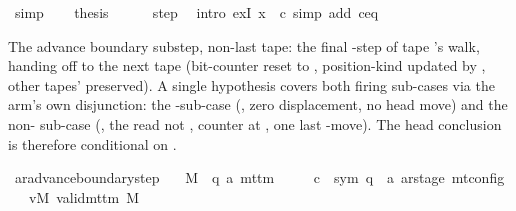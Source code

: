 \begin{isabellebody}
\ simp\isanewline
\ \ \isamarkupfalse%
\ {\isacharquery}{\kern0pt}thesis\isanewline
\ \ \ \ \isamarkupfalse%
\ step\ \isamarkupfalse%
\ {\isacharparenleft}{\kern0pt}intro\ exI{\isacharbrackleft}{\kern0pt}\ x\ {\isacharequal}{\kern0pt}\ {\isacharquery}{\kern0pt}c{\isacharprime}{\kern0pt}{\isacharprime}{\kern0pt}{\isacharbrackright}{\kern0pt}{\isacharparenright}{\kern0pt}\ {\isacharparenleft}{\kern0pt}simp\ add{\isacharcolon}{\kern0pt}\ c{\isacharprime}{\kern0pt}{\isacharunderscore}{\kern0pt}eq{\isacharparenright}{\kern0pt}\isanewline
{}\isamarkupfalse%
%
\endisatagproof
{\isafoldproof}%
%
\isadelimproof
%
\endisadelimproof
%
\begin{isamarkuptext}%
The advance boundary substep, non-last tape: the final
  -step of tape 's walk, handing off to the next
  tape  (bit-counter reset to , position-kind
  updated by , other tapes'  preserved).
  A single hypothesis covers both firing sub-cases via the arm's own
  disjunction: the -sub-case (, zero
  displacement, no head move) and the non- sub-case
  (, the read not , counter at
  , one last -move).  The head
  conclusion is therefore conditional on .%
\end{isamarkuptext}\isamarkuptrue%
\isamarkupfalse%
\ ar{\isacharunderscore}{\kern0pt}advance{\isacharunderscore}{\kern0pt}boundary{\isacharunderscore}{\kern0pt}step{\isacharcolon}{\kern0pt}\isanewline
\ \ \ M\ {\isacharcolon}{\kern0pt}{\isacharcolon}{\kern0pt}\ {\isachardoublequoteopen}{\isacharparenleft}{\kern0pt}{\isacharprime}{\kern0pt}q{\isacharcomma}{\kern0pt}\ {\isacharprime}{\kern0pt}a{\isacharparenright}{\kern0pt}\ mttm{\isachardoublequoteclose}\isanewline
\ \ \ \ \ c{\isacharprime}{\kern0pt}\ {\isacharcolon}{\kern0pt}{\isacharcolon}{\kern0pt}\ {\isachardoublequoteopen}{\isacharparenleft}{\kern0pt}sym{}{\isacharcomma}{\kern0pt}\ {\isacharprime}{\kern0pt}q\ {\isasymtimes}\ {\isacharprime}{\kern0pt}a\ ar{\isacharunderscore}{\kern0pt}stage{\isacharparenright}{\kern0pt}\ mt{\isacharunderscore}{\kern0pt}config{\isachardoublequoteclose}\isanewline
\ \ \ vM{\isacharcolon}{\kern0pt}\ {\isachardoublequoteopen}valid{\isacharunderscore}{\kern0pt}mttm\ M{\isachardoublequoteclose}\isanewline

\end{isabellebody}
